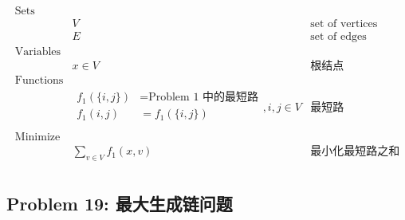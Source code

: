 \documentclass[11pt]{article}
\begin{document}
\begin{eqnarray*}
    \textrm{Sets} \\
        & V & \textrm{set of vertices} \\
        & E & \textrm{set of edges} \\
    \textrm{Variables} \\
        & x \in V & \textrm{根结点} \\
    \textrm{Functions} \\
        & \begin{array}{rl}
            f_1(\{i, j\}) &= \textrm{Problem 1 中的最短路} \\
            f_1(i, j) &= f_1(\{i, j\}) \\
        \end{array}, i, j \in V & \textrm{最短路} \\
    \textrm{Minimize} \\
        & \displaystyle \sum_{v \in V} f_1(x, v) & \textrm{最小化最短路之和} \\
\end{eqnarray*}


\newpage
\subsection*{Problem 19: 最大生成链问题}
\end{document}

